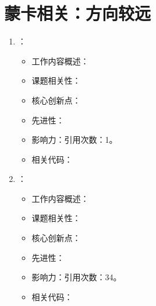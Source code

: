 \section{蒙卡相关：方向较远}
\begin{enumerate}
    \item \citet{bravyi2015simulacion}：
    \begin{itemize}
        \item 工作内容概述：
        \item 课题相关性：
        \item 核心创新点：
        \item 先进性：
        \item 影响力：引用次数：1。
        \item 相关代码：
    \end{itemize}
    \item \citet{bravyi2017polynomial}：
    \begin{itemize}
        \item 工作内容概述：
        \item 课题相关性：
        \item 核心创新点：
        \item 先进性：
        \item 影响力：引用次数：34。
        \item 相关代码：
    \end{itemize}
\end{enumerate}